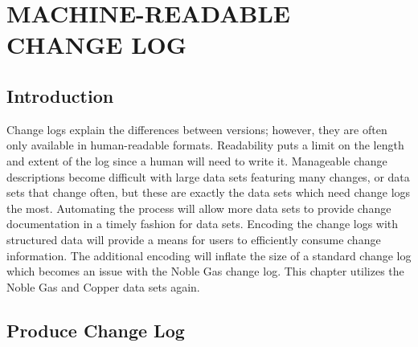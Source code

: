 
\chapter{MACHINE-READABLE CHANGE LOG}\label{ch:changelog}

\section{Introduction}

Change logs explain the differences between versions; however, they are often only available in human-readable formats.
Readability puts a limit on the length and extent of the log since a human will need to write it.
Manageable change descriptions become difficult with large data sets featuring many changes, or data sets that change often, but these are exactly the data sets which need change logs the most.
Automating the process will allow more data sets to provide change documentation in a timely fashion for data sets.
Encoding the change logs with structured data will provide a means for users to efficiently consume change information.
The additional encoding will inflate the size of a standard change log which becomes an issue with the Noble Gas change log.
This chapter utilizes the Noble Gas and Copper data sets again.

\section{Produce Change Log}

